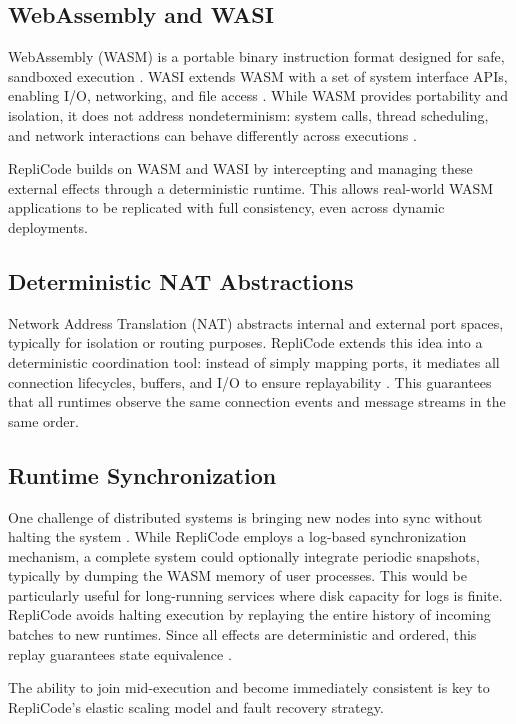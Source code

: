 \documentclass[10pt]{IEEEtran}
\begin{document}
\subsection{WebAssembly and WASI}
WebAssembly (WASM) is a portable binary instruction format designed for safe, sandboxed execution \cite{wasm2017}. WASI extends WASM with a set of system interface APIs, enabling I/O, networking, and file access \cite{wasi2023}. While WASM provides portability and isolation, it does not address nondeterminism: system calls, thread scheduling, and network interactions can behave differently across executions \cite{wasm2020}.

RepliCode builds on WASM and WASI by intercepting and managing these external effects through a deterministic runtime. This allows real-world WASM applications to be replicated with full consistency, even across dynamic deployments.

\subsection{Deterministic NAT Abstractions}
Network Address Translation (NAT) abstracts internal and external port spaces, typically for isolation or routing purposes. RepliCode extends this idea into a deterministic coordination tool: instead of simply mapping ports, it mediates all connection lifecycles, buffers, and I/O to ensure replayability \cite{deterministic2009}. This guarantees that all runtimes observe the same connection events and message streams in the same order.

\subsection{Runtime Synchronization}
One challenge of distributed systems is bringing new nodes into sync without halting the system \cite{elastic2016}. While RepliCode employs a log-based synchronization mechanism, a complete system could optionally integrate periodic snapshots, typically by dumping the WASM memory of user processes. This would be particularly useful for long-running services where disk capacity for logs is finite. RepliCode avoids halting execution by replaying the entire history of incoming batches to new runtimes. Since all effects are deterministic and ordered, this replay guarantees state equivalence \cite{consistency2015}.

The ability to join mid-execution and become immediately consistent is key to RepliCode's elastic scaling model and fault recovery strategy.
\end{document}
